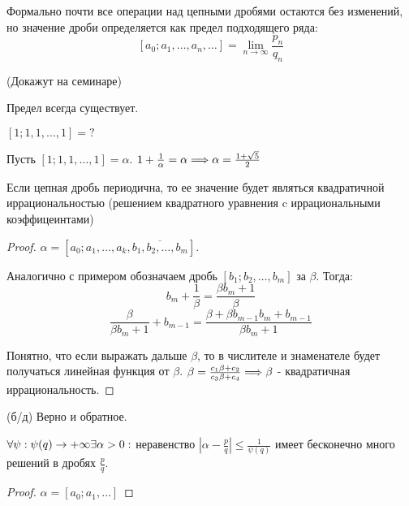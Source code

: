 Формально почти все операции над цепными дробями остаются без изменений, но значение дроби определяется как предел подходящего ряда:
$$[a_0;a_1, \dots, a_n,\dots] = \lim_{n \to \infty}\frac{p_n}{q_n}$$
\begin{theorem}{(Докажут на семинаре)}

    Предел всегда существует.
\end{theorem}

\begin{example} $[1; 1, 1, \dots, 1] = ?$

    Пусть $[1; 1, 1, \dots, 1] = \alpha$. $1 + \frac{1}{\alpha} = \alpha \Longrightarrow \alpha = \frac{1 + \sqrt{5}}{2}$
\end{example}

\begin{theorem}
    Если цепная дробь периодична, то ее значение будет являться квадратичной иррациональностью (решением квадратного уравнения c иррациональными коэффицеинтами)
\end{theorem}

\begin{proof}
    $\alpha = [a_0;a_1, \dots, a_k, \overline{b_1, b_2, \dots, b_m}].$


    Аналогично с примером обозначаем дробь $[b_1; b_2, \dots, b_m]$ за $\beta$. Тогда:
    $$b_m + \frac{1}{\beta} = \frac{\beta b_m + 1}{\beta}$$
    $$\frac{\beta}{\beta b_m + 1} + b_{m - 1} = \frac{\beta + \beta b_{m - 1} b_m + b_{m - 1}}{\beta b_m + 1}$$

    Понятно, что если выражать дальше $\beta$, то в числителе и знаменателе будет получаться линейная функция от $\beta$. $\beta = \frac{c_1 \beta + c_2}{c_3 \beta + c_4} \Longrightarrow \beta$ - квадратичная иррациональность.
\end{proof}

\begin{theorem} {(б/д)}
    Верно и обратное.
\end{theorem}

\begin{theorem}
    \(\forall \psi: \psi(q) \rightarrow +\infty \exists \alpha > 0:\) неравенство \(\left|\alpha - \frac{p}{q}\right| \le \frac{1}{\psi(q)}\) имеет бесконечно много решений в дробях \(\frac{p}{q}\).
\end{theorem}
\begin{proof}
    \(\alpha = [a_0; a_1, \dots ]\)
\end{proof}